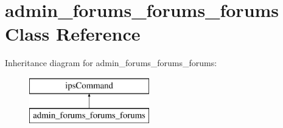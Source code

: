 \hypertarget{classadmin__forums__forums__forums}{\section{admin\-\_\-forums\-\_\-forums\-\_\-forums Class Reference}
\label{classadmin__forums__forums__forums}
}
Inheritance diagram for admin\-\_\-forums\-\_\-forums\-\_\-forums\-:\begin{figure}[H]
\begin{center}
\leavevmode
\includegraphics[height=2.000000cm]{classadmin__forums__forums__forums}
\end{center}
\end{figure}
